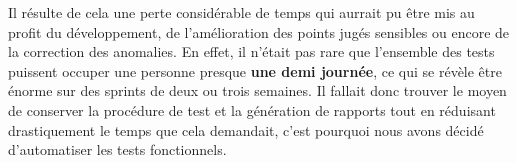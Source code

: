 	Il résulte de cela une perte considérable de temps qui aurrait pu être mis au profit du développement, de l'amélioration des points jugés sensibles ou encore de la correction des anomalies. En effet, il n'était pas rare que l'ensemble des tests puissent occuper une personne presque \textbf{une demi journée}, ce qui se révèle être énorme sur des sprints de deux ou trois semaines. Il fallait donc trouver le moyen de conserver la procédure de test et la génération de rapports tout en réduisant drastiquement le temps que cela demandait, c'est pourquoi nous avons décidé d'automatiser les tests fonctionnels.
	
	